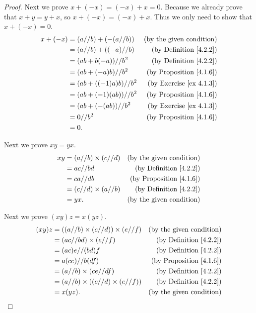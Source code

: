 \begin{proof}
Next we prove \(x + (-x) = (-x) + x = 0\).
Because we already prove that \(x + y = y + x\), so \(x + (-x) = (-x) + x\).
Thus we only need to show that \(x + (-x) = 0\).
\begin{align*}
x + (-x) &= (a // b) + (-(a // b)) & \text{(by the given condition)} \\
&= (a // b) + ((-a) // b) & \text{(by Definition \ref{4.2.2})} \\
&= (ab + b(-a)) // b^2 & \text{(by Definition \ref{4.2.2})} \\
&= (ab + (-a)b) // b^2 & \text{(by Proposition \ref{4.1.6})} \\
&= (ab + ((-1)a)b) // b^2 & \text{(by Exercise \ref{ex 4.1.3})} \\
&= (ab + (-1)(ab)) // b^2 & \text{(by Proposition \ref{4.1.6})} \\
&= (ab + (-(ab)) // b^2 & \text{(by Exercise \ref{ex 4.1.3})} \\
&= 0 // b^2 & \text{(by Proposition \ref{4.1.6})} \\
&= 0.
\end{align*}

Next we prove \(xy = yx\).
\begin{align*}
xy &= (a // b) \times (c // d) & \text{(by the given condition)} \\
&= ac // bd & \text{(by Definition \ref{4.2.2})} \\
&= ca // db & \text{(by Proposition \ref{4.1.6})} \\
&= (c // d) \times (a // b) & \text{(by Definition \ref{4.2.2})} \\
&= yx. & \text{(by the given condition)}
\end{align*}

Next we prove \((xy)z = x(yz)\).
\begin{align*}
(xy)z &= ((a // b) \times (c // d)) \times (e // f) & \text{(by the given condition)} \\
&= (ac // bd) \times (e // f) & \text{(by Definition \ref{4.2.2})} \\
&= (ac)e // (bd)f & \text{(by Definition \ref{4.2.2})} \\
&= a(ce) // b(df) & \text{(by Proposition \ref{4.1.6})} \\
&= (a // b) \times (ce // df) & \text{(by Definition \ref{4.2.2})} \\
&= (a // b) \times ((c // d) \times (e // f)) & \text{(by Definition \ref{4.2.2})} \\
&= x(yz). & \text{(by the given condition)}
\end{align*}


\end{proof}
